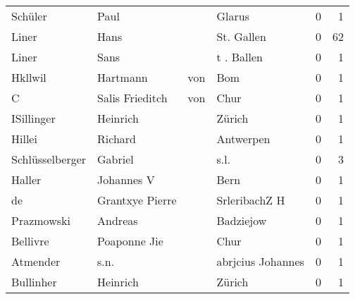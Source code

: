 \begin{tabular}{llllrr}
                  Schüler &                               Paul &             &                                      Glarus &          0 &         1 \\
                    Liner &                               Hans &             &                                  St. Gallen &          0 &        62 \\
                    Liner &                               Sans &             &                                  t . Ballen &          0 &         1 \\
                  Hkllwil &                           Hartmann &         von &                                         Bom &          0 &         1 \\
                        C &                    Salis Frieditch &         von &                                        Chur &          0 &         1 \\
               ISillinger &                           Heinrich &             &                                      Zürich &          0 &         1 \\
                   Hillei &                            Richard &             &                                   Antwerpen &          0 &         1 \\
          Schlüsselberger &                            Gabriel &             &                                        s.l. &          0 &         3 \\
                   Haller &                         Johannes V &             &                                        Bern &          0 &         1 \\
                       de &                    Grantxye Pierre &             &                               SrleribachZ H &          0 &         1 \\
               Prazmowski &                            Andreas &             &                                   Badziejow &          0 &         1 \\
                 Bellivre &                       Poaponne Jie &             &                                        Chur &          0 &         1 \\
                 Atmender &                               s.n. &             &                           abrjcius Johannes &          0 &         1 \\
                Bullinher &                           Heinrich &             &                                      Zürich &          0 &         1 \\

\end{tabular}
